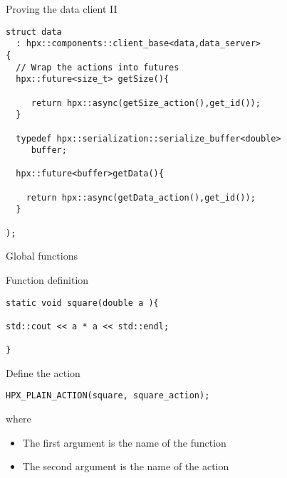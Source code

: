 \documentclass[\classoption]{beamer}
\begin{document}
\begin{frame}[fragile]{Proving the data client II}

\begin{lstlisting}
struct data
  : hpx::components::client_base<data,data_server>
{
  // Wrap the actions into futures  
  hpx::future<size_t> getSize(){

     return hpx::async(getSize_action(),get_id());
  }
  
  typedef hpx::serialization::serialize_buffer<double> 
     buffer;
     
  hpx::future<buffer>getData(){

    return hpx::async(getData_action(),get_id());
  }
        
);
\end{lstlisting}

\end{frame}

\begin{frame}[fragile]{Global functions}

\begin{block}{Function definition}
\begin{lstlisting}
static void square(double a ){

std::cout << a * a << std::endl;

}
\end{lstlisting}
\end{block}

\begin{block}{Define the action}
\begin{lstlisting}
HPX_PLAIN_ACTION(square, square_action);
\end{lstlisting}
where
\begin{itemize}
\item The first argument is the name of the function
\item The second argument is the name of the action
\end{itemize}

\end{block}
\end{frame}
\end{document}
